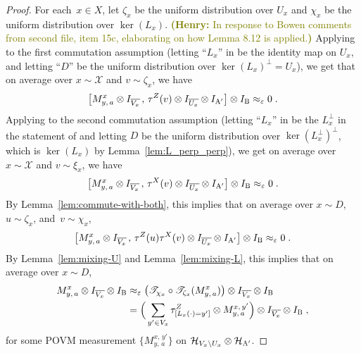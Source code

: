 \documentclass[11pt]{article}
\theoremstyle{definition}
\newcommand{\Id}{\ensuremath{I}}
\newcommand{\mH}{\ensuremath{\mathcal{H}}}
\newcommand{\eps}{\varepsilon}
\newcommand{\labelstyle}[1]{\ensuremath{\textsc{#1}}\xspace}
\newcommand{\alice}{\labelstyle{A}}
\newcommand{\bob}{\labelstyle{B}}
\renewcommand{\cal}[1]{\mathcal{#1}}
\newcommand{\hnote}[1]{\textcolor{olive}{\small {\textbf{(Henry:} #1\textbf{) }}}}
\newcommand{\hnote}[1]{}
\begin{document}
\begin{proof}
  For each~$x \in X$, let $\zeta_{x}$ be the uniform distribution over $U_x$ and
  $\chi_{x}$ be the uniform distribution over $\ker(L_x)$.
  \hnote{In response to Bowen comments from second file, item 15c, elaborating on how Lemma 8.12 is applied.} Applying  to the first commutation assumption (letting ``$L_x$'' in  be the identity map on $U_x$, and letting ``$D$'' be the uniform distribution over $\ker(L_x)^\perp = U_x$), we get that on average over $x \sim \cal{X}$ and $v \sim \zeta_x$, we have
  \begin{equation*}
    \bigl[ M^{x}_{y,\, a} \otimes \Id_{\overline{V_x}} \,,\, \tau^Z(v) \otimes
    \Id_{\overline{U_x}} \otimes \Id_{\alice'} \bigr]  \otimes \Id_\bob
    \approx_\eps 0\;.
  \end{equation*}
  Applying  to the second commutation assumption (letting ``$L_x$'' in  be the $L_x^\perp$ in the statement of  and letting $D$ be the uniform distribution over $\ker(L_x^\perp)^\perp$, which is $\ker(L_x)$ by Lemma~\ref{lem:L_perp_perp}), we get 
on average over $x \sim \cal{X}$ and $v \sim \xi_x$, we have
  \begin{equation*}
    \bigl[ M^{x}_{y,\, a} \otimes \Id_{\overline{V_x}} \,,\, \tau^X(v) \otimes
    \Id_{\overline{U_x}} \otimes \Id_{\alice'} \bigr]  \otimes \Id_\bob
    \approx_\eps 0\;.
  \end{equation*}    
By Lemma~\ref{lem:commute-with-both}, this implies that on average over $x
  \sim D$, $u \sim \zeta_{x}$, and~$v \sim \chi_{x}$,
  \begin{equation*}
    \bigl[ M^{x}_{y,\, a} \otimes \Id_{\overline{V_x}} \,,\, \tau^Z(u) \tau^X(v)
    \otimes \Id_{\overline{U_x}} \otimes \Id_{\alice'} \bigr] \otimes \Id_\bob
    \approx_\eps 0\;.
  \end{equation*}
  By Lemma~\ref{lem:mixing-U} and Lemma~\ref{lem:mixing-L},
  this implies that on average over $x\sim D$,
  \begin{align}
    M^{x}_{y,\, a} \otimes \Id_{\overline{V_x}} \otimes \Id_\bob
    & \approx_\eps \bigl( \mathscr{T}_{\chi_{x}} \circ \mathscr{T}_{\zeta_{x}} (
      M^{x}_{y,\, a}) \bigr) \otimes \Id_{\overline{V_x}} \otimes
      \Id_\bob\notag\\
    & = \Big(\sum_{y' \in V_x} \tau^Z_{[L_x(\cdot) = y']} \otimes  M^{x,\,
      y'}_{y,\, a} \Big) \otimes \Id_{\overline{V_x}} \otimes
      \Id_\bob\;,\label{eq:mixing-eq-1}
  \end{align}
	for some POVM measurement $\{M^{x,\, y'}_{y,\, a} \}$ on $\mH_{V_x \setminus
    U_x} \otimes \mH_{\alice'}$.
	

\end{proof}
\end{document}
